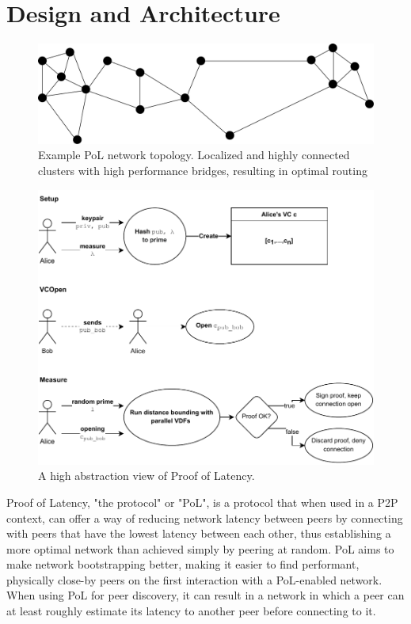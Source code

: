 \chapter{Design and Architecture}
\label{Proof of Latency}
\begin{figure}
	\includegraphics[width=\textwidth]{pictures/pol_topology.pdf}
	\caption{Example PoL network topology. Localized and highly connected clusters with high performance bridges, resulting in optimal routing}
	\label{PoL Example Topology}
\end{figure}

\begin{figure}
	\includegraphics[width=\textwidth]{pictures/PoL_highest_abstraction.pdf}
	\caption{A high abstraction view of Proof of Latency.}
	\label{PoL Diagram 1}
\end{figure}

Proof of Latency, "the protocol" or "PoL", is a protocol that when used in a P2P context, can offer a way of reducing network latency between peers by connecting with peers that have the lowest latency between each other, thus establishing a more optimal network than achieved simply by peering at random. PoL aims to make network bootstrapping better, making it easier to find performant, physically close-by peers on the first interaction with a PoL-enabled network. When using PoL for peer discovery, it can result in a network in which a peer can at least roughly estimate its latency to another peer before connecting to it.

